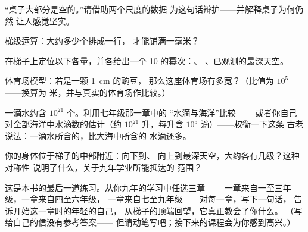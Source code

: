 \begin{exercise}[$\star$]\label{exo:g9:atoms-to-galaxies:6}
“桌子大部分是空的。”请借助两个尺度的数据
为这句话辩护——并解释桌子为何仍然
让人感觉坚实。
\end{exercise}

\begin{exercise}[$\star$]\label{exo:g9:atoms-to-galaxies:7}
梯级运算：大约多少个排成一行，
才能铺满一毫米？
\end{exercise}

\begin{exercise}[$\star$]\label{exo:g9:atoms-to-galaxies:8}
在梯子上定位以下各量，并各给出一个 10 的幂次：、
、已观测的最深天空。
\end{exercise}

\begin{exercise}[$\star\star$]\label{exo:g9:atoms-to-galaxies:9}
体育场模型：若是一颗 \qty{1}{cm} 的豌豆，
那么这座体育场有多宽？（比值为 $10^{5}$——换算为
米，并与真实的体育场作比较。）
\end{exercise}

\begin{exercise}[$\star\star$]\label{exo:g9:atoms-to-galaxies:10}
一滴水约含 $10^{21}$ 个。利用七年级那一章中的
“水滴与海洋”比较——
或者你自己对全部海洋中水滴数的估计（约
$10^{21}$ 升，每升含 $10^{5}$ 滴）——权衡一下这条
古老说法：一滴水所含的，比大海中所含的
水滴还多。
\end{exercise}

\begin{exercise}[$\star\star$]\label{exo:g9:atoms-to-galaxies:11}
你的身体位于梯子的中部附近：向下到、
向上到最深天空，大约各有几级？这种对称性
说明了什么，关于九年学业所能抵达的
范围？
\end{exercise}

\begin{exercise}[$\star\star\star$]\label{exo:g9:atoms-to-galaxies:12}
这是本书的最后一道练习。从你九年的学习中任选三章——
一章来自一至三年级，一章来自四至六年级，
一章来自七至九年级——对每一章，写下一句话，
告诉开始这一章时的年轻的自己，
从梯子的顶端回望，它真正教会了你什么。
（写给自己的信没有参考答案——
但请动笔写吧；接下来的课程会为你感到高兴。）
\end{exercise}

